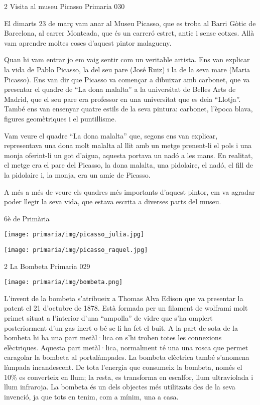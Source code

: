 \begin{news}
{2} %
{Visita al museu Picasso}
{}
{Primaria}
{030} %


El dimarts 23 de març vam anar al Museu Picasso, que es troba al Barri Gòtic de Barcelona, al carrer Montcada, que és un carreró estret, antic i sense cotxes. Allà vam aprendre moltes coses d’aquest pintor malagueny.  

Quan hi vam entrar jo em vaig sentir com un veritable artista. Ens van explicar la vida de Pablo Picasso, la del seu pare (José Ruiz) i la de la seva mare (Maria Picasso). Ens van dir que Picasso va començar a dibuixar amb carbonet, que va presentar el quadre de “La dona malalta” a la universitat de Belles Arts de Madrid, que el seu pare era  professor en una universitat que es deia “Llotja”. També ens van ensenyar quatre estils de la seva pintura: carbonet, l’època blava, figures geomètriques i el puntillisme. 

Vam veure el quadre “La dona malalta” que, segons ens van explicar,  representava una dona molt malalta al llit amb un metge prenent-li el pols i una monja oferint-li un got d’aigua, aquesta portava un nadó a les mans. En realitat, el metge era el pare del Picasso, la dona malalta, una pidolaire, el nadó, el fill de la pidolaire i, la monja, era un amic de Picasso.

A més a més de veure els quadres més importants d’aquest pintor, em va agradar poder llegir la seva vida, que estava escrita a diverses parts del museu. 

				{6è de Primària}

\noindent\texttt{[image: primaria/img/picasso\_julia.jpg]}

\noindent\texttt{[image: primaria/img/picasso\_raquel.jpg]}

\end{news}

\begin{news}
{2} %
{La Bombeta}
{}
{Primaria}
{029} %

\noindent\texttt{[image: primaria/img/bombeta.png]}

L’invent de la bombeta s’atribueix a Thomas Alva Edison que va presentar la patent  el 21 d’octubre de 1878. Està formada per un filament de wolframi molt primet situat a l’interior d’una “ampolla” de vidre que s’ha omplert posteriorment d’un gas inert o bé se li ha fet el buit. A la part de sota de la bombeta hi ha una part metàl·lica on s’hi troben totes les connexions elèctriques. Aquesta part metàl·lica, normalment té una una rosca que permet caragolar la bombeta al portalàmpades. La bombeta elèctrica també s’anomena làmpada incandescent.  De tota l’energia que consumeix la bombeta, només el 10\% es converteix en llum; la resta, es transforma en escalfor, llum ultraviolada i llum infraroja. 
La bombeta és un dels objectes més utilitzats des de la seva invenció, ja que tots en tenim, com a mínim, una a casa.


\end{news}

